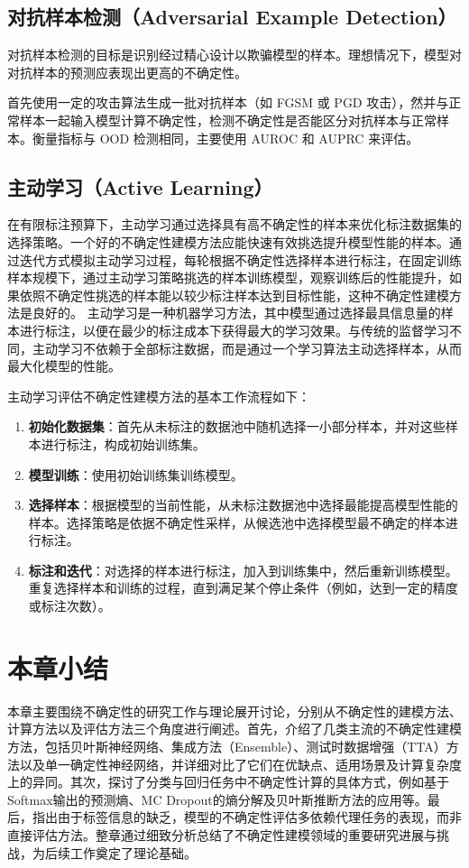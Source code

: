 \subsection{对抗样本检测（Adversarial Example Detection）}

对抗样本检测的目标是识别经过精心设计以欺骗模型的样本。理想情况下，模型对对抗样本的预测应表现出更高的不确定性。

首先使用一定的攻击算法生成一批对抗样本（如 FGSM 或 PGD 攻击），然并与正常样本一起输入模型计算不确定性，检测不确定性是否能区分对抗样本与正常样本。衡量指标与 OOD 检测相同，主要使用 AUROC 和 AUPRC 来评估。


\subsection{主动学习（Active Learning）}


在有限标注预算下，主动学习通过选择具有高不确定性的样本来优化标注数据集的选择策略。一个好的不确定性建模方法应能快速有效挑选提升模型性能的样本。通过迭代方式模拟主动学习过程，每轮根据不确定性选择样本进行标注，在固定训练样本规模下，通过主动学习策略挑选的样本训练模型，观察训练后的性能提升，如果依照不确定性挑选的样本能以较少标注样本达到目标性能，这种不确定性建模方法是良好的。
主动学习是一种机器学习方法，其中模型通过选择最具信息量的样本进行标注，以便在最少的标注成本下获得最大的学习效果。与传统的监督学习不同，主动学习不依赖于全部标注数据，而是通过一个学习算法主动选择样本，从而最大化模型的性能。


主动学习评估不确定性建模方法的基本工作流程如下：

\begin{enumerate}
    \item \textbf{初始化数据集}：首先从未标注的数据池中随机选择一小部分样本，并对这些样本进行标注，构成初始训练集。
    \item \textbf{模型训练}：使用初始训练集训练模型。
    \item \textbf{选择样本}：根据模型的当前性能，从未标注数据池中选择最能提高模型性能的样本。选择策略是依据不确定性采样，从候选池中选择模型最不确定的样本进行标注。
    \item \textbf{标注和迭代}：对选择的样本进行标注，加入到训练集中，然后重新训练模型。重复选择样本和训练的过程，直到满足某个停止条件（例如，达到一定的精度或标注次数）。
\end{enumerate}


\section{本章小结}
本章主要围绕不确定性的研究工作与理论展开讨论，分别从不确定性的建模方法、计算方法以及评估方法三个角度进行阐述。首先，介绍了几类主流的不确定性建模方法，包括贝叶斯神经网络、集成方法（Ensemble）、测试时数据增强（TTA）方法以及单一确定性神经网络，并详细对比了它们在优缺点、适用场景及计算复杂度上的异同。其次，探讨了分类与回归任务中不确定性计算的具体方式，例如基于Softmax输出的预测熵、MC Dropout的熵分解及贝叶斯推断方法的应用等。最后，指出由于标签信息的缺乏，模型的不确定性评估多依赖代理任务的表现，而非直接评估方法。整章通过细致分析总结了不确定性建模领域的重要研究进展与挑战，为后续工作奠定了理论基础。

